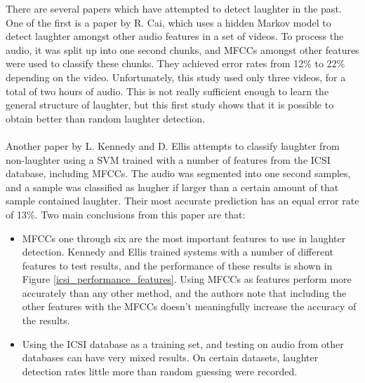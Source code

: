\documentclass[a4paper,11pt,notitlepage]{article}
\begin{document}
There are several papers which have attempted to detect laughter in the past. One of the first is a paper by R. Cai\cite{cai2003highlight}, which uses a hidden Markov model to detect laughter amongst other audio features in a set of videos. To process the audio, it was split up into one second chunks, and MFCCs amongst other features were used to classify these chunks. They achieved error rates from 12\% to 22\% depending on the video. Unfortunately, this study used only three videos, for a total of two hours of audio. This is not really sufficient enough to learn the general structure of laughter, but this first study shows that it is possible to obtain better than random laughter detection.\\
\\
Another paper by L. Kennedy and D. Ellis\cite{kennedy2004laughter} attempts to classify laughter from non-laughter using a SVM trained with a number of features from the ICSI database, including MFCCs. The audio was segmented into one second samples, and a sample was classified as laugher if larger than a certain amount of that sample contained laughter. Their most accurate prediction has an equal error rate of 13\%. Two main conclusions from this paper are that:
\begin{itemize}
\item MFCCs one through six are the most important features to use in laughter detection. Kennedy and Ellis trained systems with a number of different features to test results, and the performance of these results is shown in Figure \ref{icsi_performance_features}. Using MFCCs as features perform more accurately than any other method, and the authors note that including the other features with the MFCCs doesn't meaningfully increase the accuracy of the results.
\item Using the ICSI database as a training set, and testing on audio from other databases can have very mixed results. On certain datasets, laughter detection rates little more than random guessing were recorded.
\end{itemize}
\end{document}
